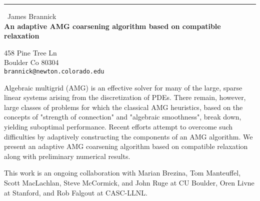 \documentclass{report}
\begin{document}
\begin{center}
\rule{6in}{1pt} \
{\large James Brannick \\
{\bf An adaptive AMG coarsening algorithm based on compatible relaxation}}

458 Pine Tree Ln  \\ Boulder Co 80304
\\
{\tt brannick@newton.colorado.edu}\end{center}

Algebraic multigrid (AMG) is an effective solver for many of the large,
sparse linear systems arising from the discretization of PDEs. There
remain, however, large classes of problems for which the classical AMG
heuristics, based on the concepts of "strength of connection" and
"algebraic smoothness", break down, yielding suboptimal performance.
Recent efforts attempt to overcome such difficulties by adaptively
constructing the components of an AMG algorithm. We present an adaptive
AMG coarsening algorithm based on compatible relaxation along with
preliminary numerical results.

This work is an ongoing collaboration with Marian Brezina, Tom
Manteuffel, Scott MacLachlan, Steve McCormick, and John Ruge at CU
Boulder, Oren Livne at Stanford, and Rob Falgout at CASC-LLNL.
\end{document}
